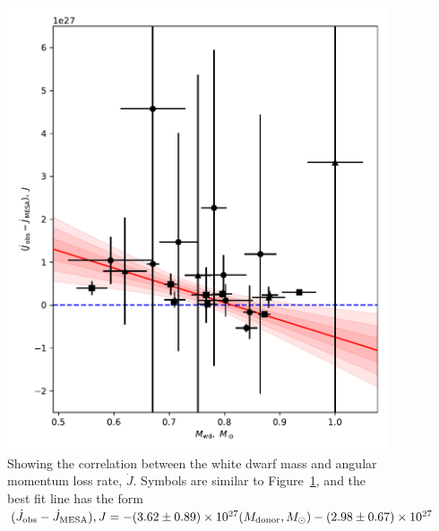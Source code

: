 
\begin{figure}
    \centering
    \includegraphics[width=\textwidth]{figures/results/Mdot/Mwd_Jdot_ex.pdf}
    \caption{Showing the correlation between the white dwarf mass and angular momentum loss rate, $\dot J$. Symbols are similar to Figure~\ref{fig:discussion:white dwarf mass vs Jdot fit}, and the best fit line has the form $(\dot J_{\rm obs} - \dot J_{\rm MESA}), J = -(3.62\pm0.89) \times 10^{27}(M_{\rm donor}, M_\odot) - (2.98\pm0.67)\times10^{27}$}
    \label{fig:discussion:white dwarf mass vs Jdot fit}
\end{figure}


